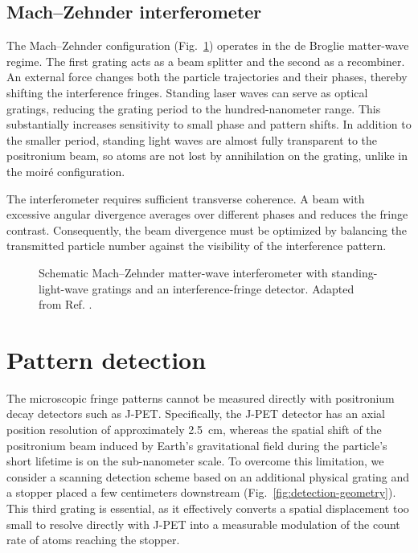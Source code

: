 \documentclass[10pt,twocolumn]{article}
\begin{document}
\subsection{Mach--Zehnder interferometer}

The Mach--Zehnder configuration (Fig.~\ref{fig:mz-principle}) operates in the de Broglie matter-wave regime\cite{Oberthaler_Bernet_Rasel_Schmiedmayer_Zeilinger_1996,Oberthaler_2002}. The first grating acts as a beam splitter and the second as a recombiner. An external force changes both the particle trajectories and their phases, thereby shifting the interference fringes. Standing laser waves can serve as optical gratings, reducing the grating period to the hundred-nanometer range. This substantially increases sensitivity to small phase and pattern shifts. In addition to the smaller period, standing light waves are almost fully transparent to the positronium beam, so atoms are not lost by annihilation on the grating, unlike in the moiré configuration.

The interferometer requires sufficient transverse coherence. A beam with excessive angular divergence averages over different phases and reduces the fringe contrast. Consequently, the beam divergence must be optimized by balancing the transmitted particle number against the visibility of the interference pattern.

\begin{figure}[ht!]
  \centering
  \resizebox{\linewidth}{!}{}
  \caption{Schematic Mach--Zehnder matter-wave interferometer with standing-light-wave gratings and an interference-fringe detector. Adapted from Ref. \cite{Mariazzi_Caravita_Doser_Nebbia_Brusa_2020}.}
  \label{fig:mz-principle}
\end{figure}

\section{Pattern detection}

The microscopic fringe patterns cannot be measured directly with positronium decay detectors such as J-PET\cite{Kowalski_Wiślicki_Shopa_Raczyński_Klimaszewski_Curcenau_Czerwiński_Dulski_Gajos_Gorgol_etal._2018,Sharma_Baran_Brusa_Caravita_Chug_Coussat_Curceanu_Czerwiński_Dadgar_Dulski_etal._2023,doi:10.1126/sciadv.abh4394}. Specifically, the J-PET detector has an axial position resolution of approximately 2.5~cm, whereas the spatial shift of the positronium beam induced by Earth's gravitational field during the particle's short lifetime is on the sub-nanometer scale. To overcome this limitation, we consider a scanning detection scheme based on an additional physical grating and a stopper placed a few centimeters downstream\cite{Mariazzi_Caravita_Doser_Nebbia_Brusa_2020} (Fig.~\ref{fig:detection-geometry}). This third grating is essential, as it effectively converts a spatial displacement too small to resolve directly with J-PET into a measurable modulation of the count rate of atoms reaching the stopper.
\end{document}
